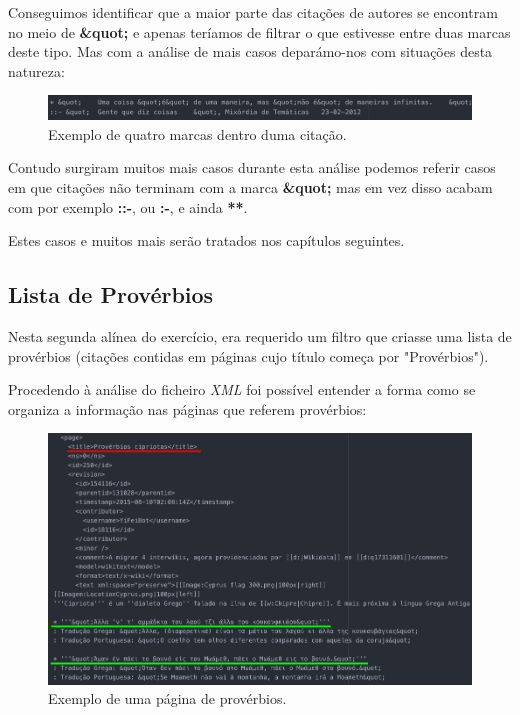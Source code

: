 \documentclass[11pt,a4paper]{report}
\begin{document}
Conseguimos identificar que a maior parte das citações de autores se encontram no meio de \textbf{\&quot;} e apenas teríamos de filtrar o que estivesse entre duas marcas deste tipo. Mas com a análise de mais casos deparámo-nos com situações desta natureza:

\begin{figure}[H]
\centering
\includegraphics[scale=0.6]{marca_dentro_quote.png}
\caption{Exemplo de quatro marcas dentro duma citação.}
\label{img:marca_in_quote}
\end{figure}

Contudo surgiram muitos mais casos durante esta análise podemos referir casos em que citações não terminam com a marca \textbf{\&quot;} mas em vez disso acabam com por exemplo \textbf{::-}, ou \textbf{:-}, e ainda \textbf{**}.

Estes casos e muitos mais serão tratados nos capítulos seguintes.


\newpage

\subsection{Lista de Provérbios}
\label{subsec:analise2}

Nesta segunda alínea do exercício, era requerido um filtro que criasse uma lista de provérbios (citações contidas em páginas cujo título começa por "Provérbios").

Procedendo à análise do ficheiro \textit{XML} foi possível entender a forma como se organiza a informação nas páginas que referem provérbios:

\begin{figure}[H]
\centering
\includegraphics[scale=0.45]{pagina_titulo.png}
\caption{Exemplo de uma página de provérbios.}
\label{img:pagina_titulo}
\end{figure}
\end{document}
